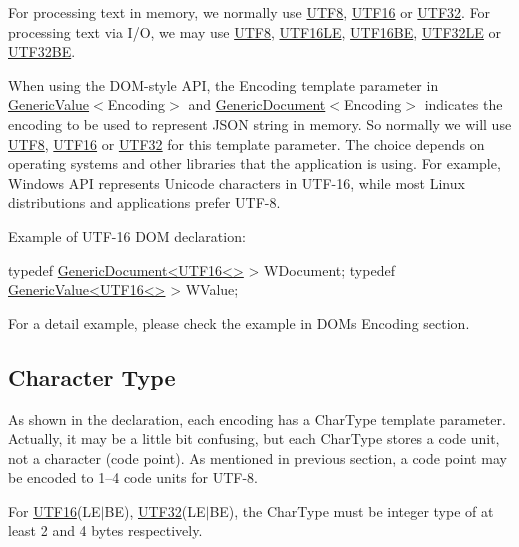 For processing text in memory, we normally use {\ttfamily \hyperlink{struct_u_t_f8}{U\+T\+F8}}, {\ttfamily \hyperlink{struct_u_t_f16}{U\+T\+F16}} or {\ttfamily \hyperlink{struct_u_t_f32}{U\+T\+F32}}. For processing text via I/O, we may use {\ttfamily \hyperlink{struct_u_t_f8}{U\+T\+F8}}, {\ttfamily \hyperlink{struct_u_t_f16_l_e}{U\+T\+F16\+LE}}, {\ttfamily \hyperlink{struct_u_t_f16_b_e}{U\+T\+F16\+BE}}, {\ttfamily \hyperlink{struct_u_t_f32_l_e}{U\+T\+F32\+LE}} or {\ttfamily \hyperlink{struct_u_t_f32_b_e}{U\+T\+F32\+BE}}.

When using the D\+O\+M-\/style A\+PI, the {\ttfamily Encoding} template parameter in {\ttfamily \hyperlink{class_generic_value}{Generic\+Value}$<$Encoding$>$} and {\ttfamily \hyperlink{class_generic_document}{Generic\+Document}$<$Encoding$>$} indicates the encoding to be used to represent J\+S\+ON string in memory. So normally we will use {\ttfamily \hyperlink{struct_u_t_f8}{U\+T\+F8}}, {\ttfamily \hyperlink{struct_u_t_f16}{U\+T\+F16}} or {\ttfamily \hyperlink{struct_u_t_f32}{U\+T\+F32}} for this template parameter. The choice depends on operating systems and other libraries that the application is using. For example, Windows A\+PI represents Unicode characters in U\+T\+F-\/16, while most Linux distributions and applications prefer U\+T\+F-\/8.

Example of U\+T\+F-\/16 D\+OM declaration\+:


\begin{DoxyCode}
\textcolor{keyword}{typedef} \hyperlink{class_generic_document}{GenericDocument<UTF16<>} > WDocument;
\textcolor{keyword}{typedef} \hyperlink{class_generic_value}{GenericValue<UTF16<>} > WValue;
\end{DoxyCode}


For a detail example, please check the example in D\+OM\textquotesingle{}s Encoding section.\hypertarget{md_Commun_Externe_RapidJSON_doc_encoding.zh-cn_CharacterType}{}\subsection{Character Type}\label{md_Commun_Externe_RapidJSON_doc_encoding.zh-cn_CharacterType}
As shown in the declaration, each encoding has a {\ttfamily Char\+Type} template parameter. Actually, it may be a little bit confusing, but each {\ttfamily Char\+Type} stores a code unit, not a character (code point). As mentioned in previous section, a code point may be encoded to 1–4 code units for U\+T\+F-\/8.

For {\ttfamily \hyperlink{struct_u_t_f16}{U\+T\+F16}(L\+E$\vert$\+BE)}, {\ttfamily \hyperlink{struct_u_t_f32}{U\+T\+F32}(L\+E$\vert$\+BE)}, the {\ttfamily Char\+Type} must be integer type of at least 2 and 4 bytes respectively.

